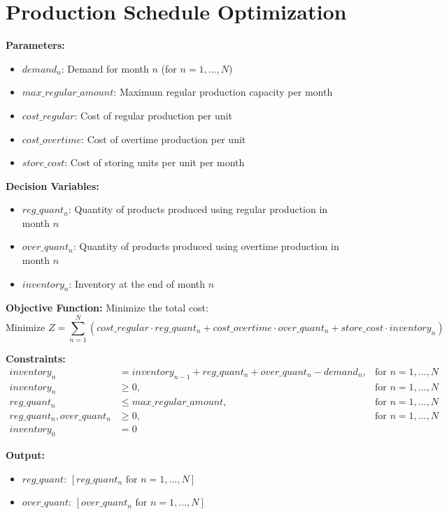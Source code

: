 \documentclass{article}
\begin{document}
\section*{Production Schedule Optimization}

\textbf{Parameters:}
\begin{itemize}
    \item $demand_n$: Demand for month $n$ (for $n = 1, \ldots, N$)
    \item $max\_regular\_amount$: Maximum regular production capacity per month
    \item $cost\_regular$: Cost of regular production per unit
    \item $cost\_overtime$: Cost of overtime production per unit
    \item $store\_cost$: Cost of storing units per unit per month
\end{itemize}

\textbf{Decision Variables:}
\begin{itemize}
    \item $reg\_quant_n$: Quantity of products produced using regular production in month $n$
    \item $over\_quant_n$: Quantity of products produced using overtime production in month $n$
    \item $inventory_n$: Inventory at the end of month $n$
\end{itemize}

\textbf{Objective Function:}
Minimize the total cost:
\[
\text{Minimize } Z = \sum_{n=1}^{N} \left( cost\_regular \cdot reg\_quant_n + cost\_overtime \cdot over\_quant_n + store\_cost \cdot inventory_n \right)
\]

\textbf{Constraints:}
\begin{align*}
    inventory_n & = inventory_{n-1} + reg\_quant_n + over\_quant_n - demand_n, & \text{for } n = 1, \ldots, N \\
    inventory_n & \geq 0, & \text{for } n = 1, \ldots, N \\
    reg\_quant_n & \leq max\_regular\_amount, & \text{for } n = 1, \ldots, N \\
    reg\_quant_n, over\_quant_n & \geq 0, & \text{for } n = 1, \ldots, N \\
    inventory_0 & = 0 & 
\end{align*}

\textbf{Output:}
\begin{itemize}
    \item $reg\_quant$: $[reg\_quant_n \text{ for } n = 1, \ldots, N]$
    \item $over\_quant$: $[over\_quant_n \text{ for } n = 1, \ldots, N]$
\end{itemize}
\end{document}
